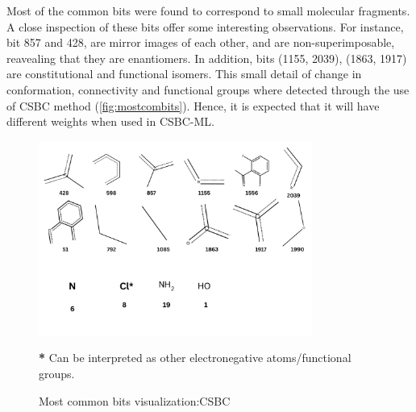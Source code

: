 Most of the common bits were found to correspond to small molecular fragments. A close inspection of these bits offer some interesting observations. For instance, bit 857 and 428, are mirror images of each other, and are non-superimposable, reavealing that they are enantiomers. In addition, bits (1155, 2039), (1863, 1917) are constitutional and functional isomers. This small detail of change in conformation, connectivity and functional groups where detected through the use of CSBC method (\autoref{fig:mostcombits}). Hence, it is expected that it will have different weights when used in CSBC-ML. 
\begin{figure}[h]
	\centering
	\begin{minipage}{\textwidth}
		\centering
		\includegraphics[width=0.8\textwidth]{mostcommonbitv2.png}
		\vspace{-0.3cm}
		
		\parbox{\textwidth}{\centering \footnotesize \textbf{*} Can be interpreted as other electronegative atoms/functional groups.}
		
		\vspace{0.3cm}
		\caption{Most common bits visualization:CSBC}
		\label{fig:mostcombits}
	\end{minipage}
\end{figure}
\FloatBarrier
